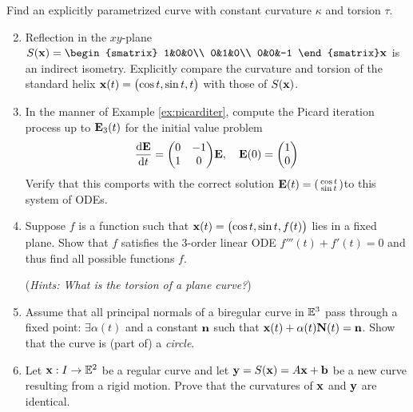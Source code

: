 \begin{exercises}
\exstart Find an explicitly parametrized curve with constant curvature $\kappa$ and torsion $\tau$.


\begin{enumerate}\setcounter{enumi}{1}
  \item Reflection in the $xy$-plane $S(\vx)=\smash[t]{\begin{smatrix}
		1&0&0\\
		0&1&0\\
		0&0&-1
\end{smatrix}}\vx$ is an indirect isometry.	Explicitly compare the curvature and torsion of the standard helix $\vx(t)=\bigl(\cos t,\sin t,t\bigr)$ with those of $S(\vx)$.


	\item In the manner of Example \ref{ex:picarditer}, compute the Picard iteration process up to $\vE_3(t)$ for the initial value problem
	\[\diff[\vE]{t}=\begin{pmatrix}
  0&-1\\
  1&0
  \end{pmatrix}\!\vE,\quad \vE(0)=\twovec 10\]
  Verify that this comports with the correct solution $\vE(t)=\stwovec{\cos t}{\sin t}$to this system of ODEs.

  
  \item Suppose $f$ is a function such that $\vx(t)=\bigl(\cos t,\sin t,f(t)\bigr)$ lies  in a fixed plane. Show that $f$ satisfies the 3\rd-order linear ODE $f'''(t)+f'(t)=0$ and thus find all possible functions $f$.\par
  (\emph{Hints: What is the torsion of a plane curve?})
  
  
	\item Assume that all principal normals of a biregular curve in $\E^3$ pass through a fixed point: $\exists\alpha(t)$ and a constant $\vn$ such that $\vx(t)+\alpha(t)\vN(t)=\vn$. Show that the curve is (part of) a \emph{circle}.
  
  
  \item Let $\vx:I\to \E^2$ be a regular curve and let $\vy=S(\vx)=A\vx+\vb$ be a new curve resulting from a rigid motion. Prove that the curvatures of $\vx$ and $\vy$ are identical.
   
   

\end{enumerate}
\end{exercises}
